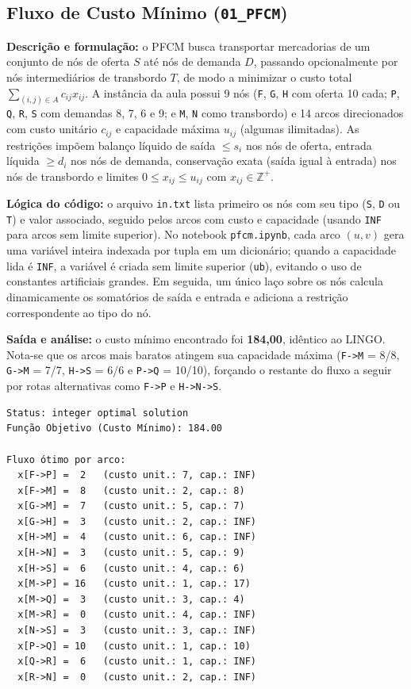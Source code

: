 \documentclass[11pt,a4paper]{article}
\begin{document}
\subsection{Fluxo de Custo Mínimo (\texttt{01\_PFCM})}
\textbf{Descrição e formulação:} o PFCM busca transportar mercadorias de um conjunto de nós de oferta $S$ até nós de demanda $D$, passando opcionalmente por nós intermediários de transbordo $T$, de modo a minimizar o custo total $\sum_{(i,j)\in A} c_{ij} x_{ij}$. A instância da aula possui 9 nós (\texttt{F}, \texttt{G}, \texttt{H} com oferta 10 cada; \texttt{P}, \texttt{Q}, \texttt{R}, \texttt{S} com demandas 8, 7, 6 e 9; e \texttt{M}, \texttt{N} como transbordo) e 14 arcos direcionados com custo unitário $c_{ij}$ e capacidade máxima $u_{ij}$ (algumas ilimitadas). As restrições impõem balanço líquido de saída $\le s_i$ nos nós de oferta, entrada líquida $\ge d_i$ nos nós de demanda, conservação exata (saída igual à entrada) nos nós de transbordo e limites $0 \le x_{ij} \le u_{ij}$ com $x_{ij} \in \mathbb{Z}^+$.

\textbf{Lógica do código:} o arquivo \texttt{in.txt} lista primeiro os nós com seu tipo (\texttt{S}, \texttt{D} ou \texttt{T}) e valor associado, seguido pelos arcos com custo e capacidade (usando \texttt{INF} para arcos sem limite superior). No notebook \texttt{pfcm.ipynb}, cada arco $(u,v)$ gera uma variável inteira indexada por tupla em um dicionário; quando a capacidade lida é \texttt{INF}, a variável é criada sem limite superior (\texttt{ub}), evitando o uso de constantes artificiais grandes. Em seguida, um único laço sobre os nós calcula dinamicamente os somatórios de saída e entrada e adiciona a restrição correspondente ao tipo do nó.

\textbf{Saída e análise:} o custo mínimo encontrado foi \textbf{184,00}, idêntico ao LINGO. Nota-se que os arcos mais baratos atingem sua capacidade máxima (\texttt{F->M} = 8/8, \texttt{G->M} = 7/7, \texttt{H->S} = 6/6 e \texttt{P->Q} = 10/10), forçando o restante do fluxo a seguir por rotas alternativas como \texttt{F->P} e \texttt{H->N->S}.

\begin{minipage}{\linewidth}
\begin{lstlisting}
Status: integer optimal solution
Função Objetivo (Custo Mínimo): 184.00

Fluxo ótimo por arco:
  x[F->P] =  2   (custo unit.: 7, cap.: INF)
  x[F->M] =  8   (custo unit.: 2, cap.: 8)
  x[G->M] =  7   (custo unit.: 5, cap.: 7)
  x[G->H] =  3   (custo unit.: 2, cap.: INF)
  x[H->M] =  4   (custo unit.: 6, cap.: INF)
  x[H->N] =  3   (custo unit.: 5, cap.: 9)
  x[H->S] =  6   (custo unit.: 4, cap.: 6)
  x[M->P] = 16   (custo unit.: 1, cap.: 17)
  x[M->Q] =  3   (custo unit.: 3, cap.: 4)
  x[M->R] =  0   (custo unit.: 4, cap.: INF)
  x[N->S] =  3   (custo unit.: 3, cap.: INF)
  x[P->Q] = 10   (custo unit.: 1, cap.: 10)
  x[Q->R] =  6   (custo unit.: 1, cap.: INF)
  x[R->N] =  0   (custo unit.: 2, cap.: INF)
\end{lstlisting}
\end{minipage}
\end{document}
